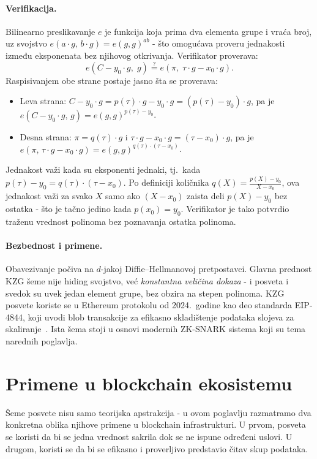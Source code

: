 \paragraph{Verifikacija.}
Bilinearno preslikavanje $e$ je funkcija koja prima dva elementa grupe i vraća broj,
uz svojstvo $e(a \cdot g,\, b \cdot g) = e(g, g)^{ab}$ - što omogućava proveru jednakosti
između eksponenata bez njihovog otkrivanja. Verifikator proverava:
\[
  e(C - y_0 \cdot g,\; g) \stackrel{?}{=} e(\pi,\; \tau \cdot g - x_0 \cdot g).
\]
Raspisivanjem obe strane postaje jasno šta se proverava:
\begin{itemize}
  \item Leva strana: $C - y_0 \cdot g = p(\tau)\cdot g - y_0 \cdot g = (p(\tau) - y_0)\cdot g$,
    pa je $e(C - y_0 \cdot g,\, g) = e(g,g)^{p(\tau) - y_0}$.
  \item Desna strana: $\pi = q(\tau)\cdot g$ i $\tau \cdot g - x_0 \cdot g = (\tau - x_0)\cdot g$,
    pa je $e(\pi,\, \tau \cdot g - x_0 \cdot g) = e(g,g)^{q(\tau)\cdot(\tau - x_0)}$.
\end{itemize}
Jednakost važi kada su eksponenti jednaki, tj.\ kada
$p(\tau) - y_0 = q(\tau)\cdot(\tau - x_0)$.
Po definiciji količnika $q(X) = \frac{p(X)-y_0}{X-x_0}$, ova jednakost važi za svako $X$
samo ako $(X - x_0)$ zaista deli $p(X) - y_0$ bez ostatka - što je tačno jedino kada
$p(x_0) = y_0$. Verifikator je tako potvrdio traženu vrednost polinoma bez poznavanja
ostatka polinoma.

\paragraph{Bezbednost i primene.}
Obavezivanje počiva na $d$-jakoj Diffie--Hellmanovoj pretpostavci. Glavna prednost KZG
šeme nije hiding svojstvo, već \emph{konstantna veličina dokaza} - i posveta i svedok su
uvek jedan element grupe, bez obzira na stepen polinoma. KZG posvete koriste se u Ethereum protokolu od 2024.\
godine kao deo standarda EIP-4844, koji uvodi blob transakcije za efikasno skladištenje
podataka slojeva za skaliranje~\cite{eip4844}. Ista šema stoji u osnovi modernih
ZK-SNARK sistema koji su tema narednih poglavlja.

\section{Primene u blockchain ekosistemu}
\label{sec:commitments-blockchain}

Šeme posvete nisu samo teorijska apstrakcija - u ovom poglavlju razmatramo dva konkretna oblika njihove primene u blockchain infrastrukturi. U prvom, posveta se koristi da bi se jedna vrednost sakrila dok se ne ispune određeni uslovi. U drugom, koristi se da bi se efikasno i proverljivo predstavio čitav skup podataka.
